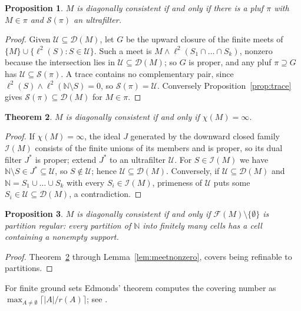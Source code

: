 \documentclass[11pt,reqno]{amsart}
\newtheorem{theorem}{Theorem}[section]
\newtheorem{proposition}[theorem]{Proposition}
\theoremstyle{definition}
\newcommand{\N}{\mathbb{N}}
\newcommand{\F}{\mathcal{F}}
\newcommand{\cD}{\mathcal{D}}
\newcommand{\cI}{\mathcal{I}}
\newcommand{\cS}{\mathcal{S}}
\newcommand{\cU}{\mathcal{U}}
\newcommand{\pluf}{\pi}
\begin{document}
\begin{proposition}\label{prop:consistentiff}
$M$ is diagonally consistent if and only if there is a pluf $\pluf$ with
$M\in\pluf$ and $\cS(\pluf)$ an ultrafilter.
\end{proposition}

\begin{proof}
Given $\cU\subseteq\cD(M)$, let $G$ be the upward closure of the finite meets
of $\{M\}\cup\{\ell^2(S):S\in\cU\}$. Such a meet is
$M\wedge\ell^2(S_1\cap\dots\cap S_k)$, nonzero because the intersection lies in
$\cU\subseteq\cD(M)$; so $G$ is proper, and any pluf $\pluf\supseteq G$ has
$\cU\subseteq\cS(\pluf)$. A trace contains no complementary pair, since
$\ell^2(S)\wedge\ell^2(\N\setminus S)=0$, so $\cS(\pluf)=\cU$. Conversely
Proposition~\ref{prop:trace} gives $\cS(\pluf)\subseteq\cD(M)$ for $M\in\pluf$.
\end{proof}

\begin{theorem}\label{thm:covering}
$M$ is diagonally consistent if and only if $\chi(M)=\infty$.
\end{theorem}

\begin{proof}
If $\chi(M)=\infty$, the ideal $J$ generated by the downward closed family
$\cI(M)$ consists of the finite unions of its members and is proper, so its
dual filter $J^*$ is proper; extend $J^*$ to an ultrafilter $\cU$. For
$S\in\cI(M)$ we have $\N\setminus S\in J^*\subseteq\cU$, so $S\notin\cU$; hence
$\cU\subseteq\cD(M)$. Conversely, if $\cU\subseteq\cD(M)$ and
$\N=S_1\cup\dots\cup S_k$ with every $S_i\in\cI(M)$, primeness of $\cU$ puts
some $S_i\in\cU\subseteq\cD(M)$, a contradiction.
\end{proof}

\begin{proposition}\label{prop:partitionregular}
$M$ is diagonally consistent if and only if $\F(M)\setminus\{\emptyset\}$ is
partition regular: every partition of $\N$ into finitely many cells has a cell
containing a nonempty support.
\end{proposition}

\begin{proof}
Theorem~\ref{thm:covering} through Lemma~\ref{lem:meetnonzero}, covers being
refinable to partitions.
\end{proof}

For finite ground sets Edmonds' theorem \cite{E65} computes the covering number
as $\max_{A\neq\emptyset}\lceil|A|/r(A)\rceil$; see \cite[\S11.3]{Ox11}.
\end{document}

